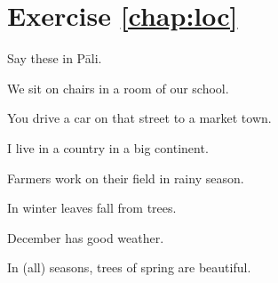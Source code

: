 \section*{Exercise \ref{chap:loc}}
Say these in P\=ali.
\begin{compactenum}
\item We sit on chairs in a room of our school.
\item You drive a car on that street to a market town.
\item I live in a country in a big continent.
\item Farmers work on their field in rainy season.
\item In winter leaves fall from trees.
\item December has good weather.
\item In (all) seasons, trees of spring are beautiful.
\end{compactenum}
